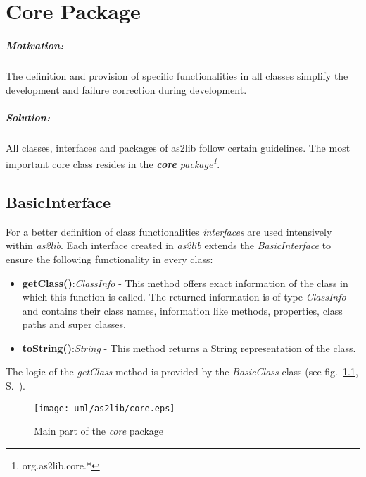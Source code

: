 
\chapter{Core Package}
\label{sec:CorePackage}

\paragraph{Motivation:}
The definition and provision of specific functionalities in all classes simplify the development and failure correction during development.

\paragraph{Solution:}
All classes, interfaces and packages of as2lib follow certain guidelines. The most important core class resides in the \emph{\textbf{core} package\footnote{org.as2lib.core.*}}.

\section{BasicInterface}
\label{sec:BasicInterface}

For a better definition of class functionalities \emph{interfaces} are used intensively within {\sl as2lib}. Each interface created in {\sl as2lib} extends the \emph{BasicInterface} to ensure the following functionality in every class:

\begin{itemize}
	\item \textbf{getClass()}:\textit{ClassInfo} - This method offers exact information of the class in which this function is called. The returned information is of type \emph{ClassInfo} and contains their class names, information like methods, properties, class paths and super classes.
	\item \textbf{toString()}:\textit{String} - This method returns a String representation of the class.
\end{itemize}

The logic of the \emph{getClass} method is provided by the \emph{BasicClass} class
(see fig.\  \ref{fig:as2libcorepackage}, S.\ \pageref{fig:as2libcorepackage}).

\begin{figure}[!ht]
\begin{center}
\texttt{[image: uml/as2lib/core.eps]}
\caption{Main part of the \emph{core} package}
\label{fig:as2libcorepackage}
\end{center}
\end{figure}

